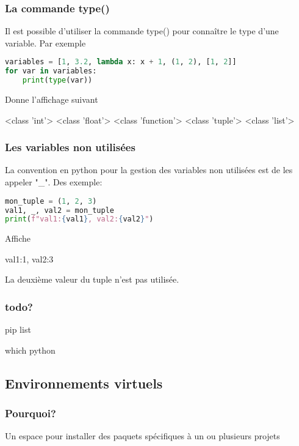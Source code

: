 \subsubsection{La commande type()}

Il est possible d'utiliser la commande type() pour connaître le type d'une variable. Par exemple

\begin{lstlisting}[language=Python]
variables = [1, 3.2, lambda x: x + 1, (1, 2), [1, 2]]
for var in variables:
    print(type(var))
\end{lstlisting}
Donne l'affichage suivant
\begin{terminal}
<class 'int'>
<class 'float'>
<class 'function'>
<class 'tuple'>
<class 'list'>
\end{terminal}


\subsubsection{Les variables non utilisées}

La convention en python pour la gestion des variables non utilisées est de les appeler "\_". Des exemple:

\begin{lstlisting}[language=Python]
mon_tuple = (1, 2, 3)
val1, _, val2 = mon_tuple
print(f"val1:{val1}, val2:{val2}")
\end{lstlisting}
Affiche
\begin{terminal}
val1:1, val2:3
\end{terminal}
La deuxième valeur du tuple n'est pas utilisée.


\subsubsection{todo?}

pip list

which python

\subsection{Environnements virtuels}

\subsubsection{Pourquoi?}
Un espace pour installer des paquets spécifiques à un ou plusieurs projets


